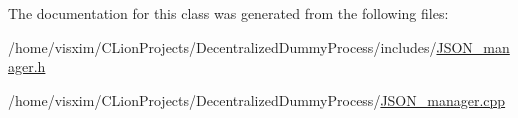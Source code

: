 The documentation for this class was generated from the following files\+:\begin{DoxyCompactItemize}
\item 
/home/visxim/\+C\+Lion\+Projects/\+Decentralized\+Dummy\+Process/includes/\hyperlink{JSON__manager_8h}{J\+S\+O\+N\+\_\+manager.\+h}\item 
/home/visxim/\+C\+Lion\+Projects/\+Decentralized\+Dummy\+Process/\hyperlink{JSON__manager_8cpp}{J\+S\+O\+N\+\_\+manager.\+cpp}\end{DoxyCompactItemize}
